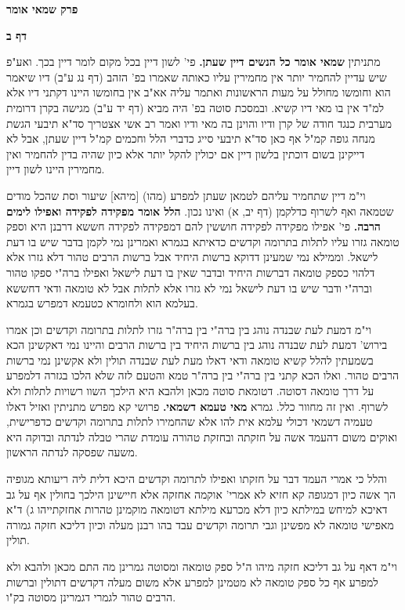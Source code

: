 \documentclass[12pt, openany]{book}
\newcommand{\sethebfont}{
\fontsize{10.5pt}{21.0pt} \selectfont
}
\newcommand{\twocol}[1]{
	{\sethebfont \begin{multicols}{2}
			#1
	\end{multicols}}	
}
\newcommand{\chapname}{}
\newcommand{\sectname}{}
\newcommand{\newchap}[1]{
	\addcontentsline{toc}{chapter}{#1}
	\renewcommand{\chapname}{#1}
		\begin{center}
			\textbf{%
\fontsize{16pt}{16pt}\selectfont
				#1}
		\end{center}
}
\newcommand{\newsection}[1]{
	\addcontentsline{toc}{section}{#1}
	\renewcommand{\sectname}{#1}	
	\vspace{-\baselineskip}
	\begin{center}
		\textbf{%
\fontsize{16pt}{16pt}\selectfont
			#1}
	\end{center}
	\vspace{-\baselineskip}
	\nopagebreak
}
\begin{document}
\newchap{פרק  שמאי אומר}
\newsection{דף ב}
\twocol{
מתניתין \textbf{שמאי אומר כל הנשים דיין שעתן.}  פי' לשון דיין בכל מקום לומר דיין בכך. ואע"פ שיש עדיין להחמיר יותר אין מחמירין עליו כאותה שאמרו בפ' הזהב (דף נג ע"ב) דיו שיאמר הוא וחומשו מחולל על מעות הראשונות ואתמר עליה אא"ב אין בחומשו היינו דקתני דיו אלא למ"ד אין בו מאי דיו קשיא. ובמסכת סוטה בפ' היה מביא (דף יד ע"ב) מגישה בקרן דרומית מערבית כנגד חודה של קרן ודיו והוינן בה מאי ודיו ואמר רב אשי אצטריך סד"א תיבעי הגשת מנחה גופה קמ"ל אף כאן סד"א תיבעי סייג כדברי הלל וחכמים קמ"ל דיין שעתן, אבל לא דייקינן בשום דוכתין בלשון דיין אם יכולין להקל יותר אלא כיון שהיה בדין להחמיר ואין מחמירין היינו לשון דיין.\par וי"מ דיין שתחמיר עליהם לטמאן שעתן למפרע (מהו) [מיהא] שיעור וסת שהכל מודים שטמאה ואף לשרוף כדלקמן (דף יב, א) ואינו נכון. 
\textbf{הלל אומר מפקידה לפקידה ואפילו לימים הרבה.}  פי' אפילו מפקידה לפקידה חוששין להם דמפקידה לפקידה חששא דרבנן היא וספק טומאה גזרו עליו לתלות בתרומה וקדשים כדאיתא בגמרא ואמרינן נמי לקמן בדבר שיש בו דעת לישאל. וממילא נמי שמעינן דדוקא ברשות היחיד אבל ברשות הרבים טהור דלא גזרו אלא דלהוי כספק טומאה דברשות היחיד ובדבר שאין בו דעת לישאל ואפילו ברה"י ספקו טהור וברה"י ודבר שיש בו דעת לישאל נמי לא גזרו אלא לתלות אבל לא טומאה ודאי דחששא בעלמא הוא ולחומרא כטעמא דמפרש בגמרא.\par וי"מ דמעת לעת שבנדה נוהג בין ברה"י בין ברה"ר גזרו לתלות בתרומה וקדשים וכן אמרו בירוש' דמעת לעת שבנדה נוהג בין ברשות היחיד בין ברשות הרבים והיינו נמי דאקשינן הכא בשמעתין להלל קשיא טומאה ודאי דאלו מעת לעת שבנדה תולין ולא אקשינן נמי ברשות הרבים טהור. ואלו הכא קתני בין ברה"י בין ברה"ר טמא והטעם לזה שלא הלכו בגזרה דלמפרע על דרך טומאה דסוטה. דטומאת סוטה מכאן ולהבא היא הילכך השוו רשויות לתלות ולא לשרוף. ואין זה מחוור כלל. 
גמרא \textbf{מאי טעמא דשמאי.}  פרושי קא מפרש מתניתין ואזיל דאלו טעמיה דשמאי דכולי עלמא אית להו אלא שהחמירו לתלות בתרומה וקדשים כדפרישית, ואוקים משום דהעמד אשה על חזקתה ובחזקת טהורה עומדת שהרי טבלה לנדתה ובדוקה היא משעה שפסקה לנדתה הראשון.\par  והלל כי אמרי העמד דבר על חזקתו ואפילו לתרומה וקדשים היכא דלית ליה ריעותא מגופיה הך אשה כיון דמגופה קא חזיא לא אמרי' אוקמה אחזקה אלא חיישינן הילכך בחולין אף על גב דאיכא למיחש במילתא כיון דלא מכרעא מילתא דטומאה מוקמינן טהרות אחזקתייהו ג) ד"א מאפישי טומאה לא מפשינן וגבי תרומה וקדשים עבד בהו רבנן מעלה וכיון דליכא חזקה גמורה תולין.\par וי"מ דאף על גב דליכא חזקה מיהו ה"ל ספק טומאה ומסוטה גמרינן מה התם מכאן ולהבא ולא למפרע אף כל ספק טומאה לא מטמינן למפרע אלא משום מעלה דקדשים דתולין וברשות הרבים טהור לגמרי דגמרינן מסוטה בק"ו. 
}
\end{document}
